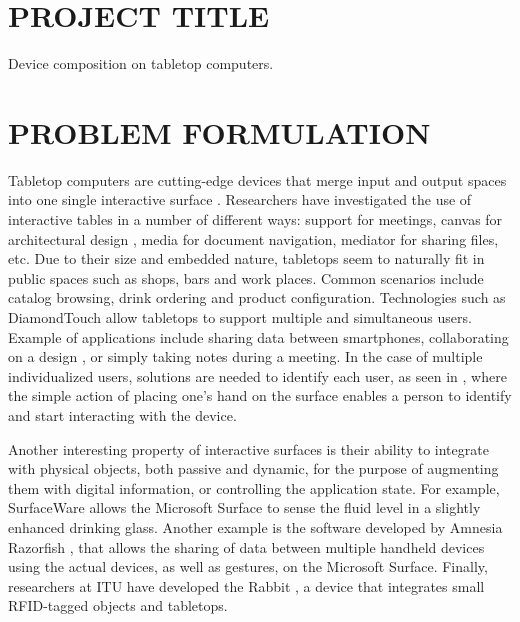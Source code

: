 \section{PROJECT TITLE}

Device composition on tabletop computers.

\section{PROBLEM FORMULATION}

Tabletop computers are cutting-edge devices that merge input and output spaces into one single interactive surface \cite{Wellner:1993:digitaldesk}.
Researchers have investigated the use of interactive tables in a number of different ways: support for meetings, canvas for architectural design \cite{Clifton:2010:sketchtop}, media for document navigation, mediator for sharing files, etc.
Due to their size and embedded nature, tabletops seem to naturally fit in public spaces such as shops, bars and work places.
Common scenarios include catalog browsing, drink ordering and product configuration.
Technologies such as DiamondTouch \cite{Dietz:2001:diamondtouch} allow tabletops to support multiple and simultaneous users. Example of applications include sharing data between smartphones, collaborating on a design \cite{Hunter:2011:memtable}, or simply taking notes during a meeting.
In the case of multiple individualized users, solutions are needed to identify each user, as seen in \cite{Schmidt:2010:handsdown}, where the simple action of placing one's hand on the surface enables a person to identify and start interacting with the device.

Another interesting property of interactive surfaces is their ability to integrate with physical objects, both passive and dynamic, for the purpose of augmenting them with digital information, or controlling the application state.
For example, SurfaceWare \cite{Dietz:2009:surfaceware} allows the Microsoft Surface to sense the fluid level in a slightly enhanced drinking glass.
Another example is the software developed by Amnesia Razorfish \cite{amnesia}, that allows the sharing of data between multiple handheld devices using the actual devices, as well as gestures, on the Microsoft Surface.
Finally, researchers at ITU have developed the Rabbit \cite{rabbit}, a device that integrates small RFID-tagged objects and tabletops.

